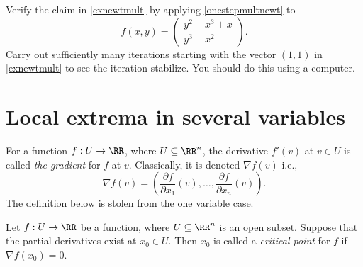 \documentclass{article}
\begin{document}
  \beginshex
  Verify the claim in \eqref{exnewtmult} by applying \eqref{onestepmultnewt} to
  $$
  f(x, y) =
  \begin{pmatrix}
    y^2 - x^3 + x\\
    y^3 - x^2
  \end{pmatrix}.
  $$
  Carry out sufficiently many iterations starting with the vector $(1, 1)$ in
  \eqref{exnewtmult} to see the iteration stabilize. You should do this
  using a computer.
  \endshex


  
  \section{Local extrema in several variables}

For a function
$f:U\rightarrow \RR$, where $U\subseteq \RR^n$, the derivative
$f'(v)$ at $v\in U$ is called \emph{the gradient}
for $f$ at $v$. Classically, it is denoted $ \nabla f(v)$ i.e.,
$$
\nabla f(v) = \left(\frac{\partial f}{\partial x_1}(v), \dots, \frac{\partial f}{\partial x_n} (v)\right).
$$
The definition below is stolen from the one variable case.

\begin{definition}[emph]\label{Critptsevvar}
  Let $f:U\rightarrow \RR$ be a function, where $U\subseteq \RR^n$ is
  an open subset. Suppose that the partial derivatives exist at
  $x_0\in U$. Then $x_0$ is called a \emph{critical
    point} for $f$ if $\nabla f(x_0)=0$.
\end{definition}
\end{document}
